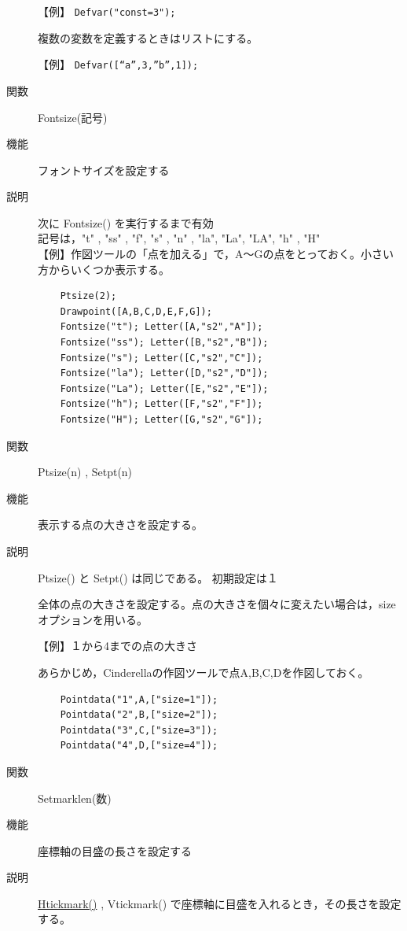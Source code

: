 \documentclass[papersize,a4paper,12pt,uplatex]{jsarticle}
\begin{document}
\begin{description}
【例】  \verb|Defvar("const=3");|

\vspace{\baselineskip}
  複数の変数を定義するときはリストにする。
  
【例】  \verb|Defvar([“a”,3,”b”,1]);|

\vspace{\baselineskip}
\hypertarget{fontsize}{}
\item[関数]  Fontsize(記号)
\item[機能]  フォントサイズを設定する
\item[説明]  次に Fontsize() を実行するまで有効\\
  記号は，"t" , "ss" , "f", "s" , "n" , "la",  "La", "LA", "h" , "H"\\

【例】作図ツールの「点を加える」で，A〜Gの点をとっておく。小さい方からいくつか表示する。
\begin{verbatim}
    Ptsize(2);
    Drawpoint([A,B,C,D,E,F,G]);
    Fontsize("t"); Letter([A,"s2","A"]);
    Fontsize("ss"); Letter([B,"s2","B"]);
    Fontsize("s"); Letter([C,"s2","C"]);
    Fontsize("la"); Letter([D,"s2","D"]);
    Fontsize("La"); Letter([E,"s2","E"]);
    Fontsize("h"); Letter([F,"s2","F"]);
    Fontsize("H"); Letter([G,"s2","G"]);
\end{verbatim}


\vspace{\baselineskip}
\hypertarget{setpt}{}
\hypertarget{ptsize}{}
\item[関数]  Ptsize(n) , Setpt(n)
\item[機能]  表示する点の大きさを設定する。
\item[説明]  Ptsize() と Setpt() は同じである。 初期設定は１

全体の点の大きさを設定する。点の大きさを個々に変えたい場合は，sizeオプションを用いる。

\vspace{\baselineskip}
【例】１から4までの点の大きさ

あらかじめ，Cinderellaの作図ツールで点A,B,C,Dを作図しておく。
\begin{verbatim}
    Pointdata("1",A,["size=1"]);
    Pointdata("2",B,["size=2"]);
    Pointdata("3",C,["size=3"]);
    Pointdata("4",D,["size=4"]);
\end{verbatim}
\hspace{10mm}

\hypertarget{setmarklen}{}
\item[関数]  Setmarklen(数)  
\item[機能]  座標軸の目盛の長さを設定する
\item[説明]   \hyperlink{htickmark}{Htickmark()} , Vtickmark() で座標軸に目盛を入れるとき，その長さを設定する。 


\end{description}
\end{document}
